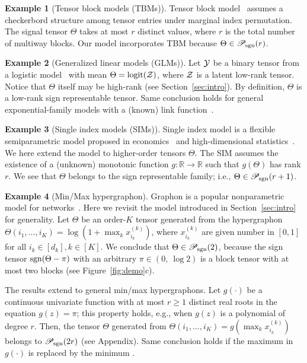 \documentclass[11pt]{article}
\theoremstyle{plain}
\theoremstyle{definition}
\newtheorem{example}{Example}
\def\sign{\textup{sgn}}
\def\caliP{\mathscr{P}_{\textup{sgn}}}
\begin{document}
\begin{example}[Tensor block models (TBMs)] Tensor block model~\citep{wang2019multiway,chi2020provable} assumes a checkerbord structure among tensor entries under marginal index permutation. The signal tensor $\Theta$ takes at most $r$ distinct values, where $r$ is the total number of multiway blocks. Our model incorporates TBM because $\Theta \in \caliP(r)$. \\
\end{example}


\begin{example}[Generalized linear models (GLMs)] Let $\mathcal{Y}$ be a binary tensor from a logistic model~\citep{wang2018learning} with mean $\Theta=\text{logit}(\mathcal{Z})$, where $\mathcal{Z}$ is a latent low-rank tensor. Notice that $\Theta$ itself may be high-rank (see Section~\ref{sec:intro}). By definition, $\Theta$ is a low-rank sign representable tensor. Same conclusion holds for general exponential-family models with a (known) link function~\citep{hong2020generalized}. \\
\end{example}

\begin{example}[Single index models (SIMs)] Single index model is a flexible semiparametric model proposed in economics~\citep{robinson1988root} and high-dimensional statistics~\citep{balabdaoui2019least,ganti2017learning}. We here extend the model to higher-order tensors $\Theta$. The SIM assumes the existence of a (unknown) monotonic function $g\colon \mathbb{R}\to \mathbb{R}$ such that $g(\Theta)$ has rank $r$. We see that $\Theta$ belongs to the sign representable family; i.e., $\Theta\in \caliP(r+1)$. \\
\end{example}

\begin{example}[Min/Max hypergraphon]\label{eq:example}Graphon is a popular nonparametric model for networks~\citep{chan2014consistent,xu2018rates}. Here we revisit the model introduced in Section~\ref{sec:intro} for generality. Let $\Theta$ be an order-$K$ tensor generated from the hypergraphon $\Theta(i_1,\ldots,i_K)=\log(1+\max_kx^{(k)}_{i_k})$, where $x^{(k)}_{i_k}$ are given number in $[0,1]$ for all $i_k\in[d_k], k\in[K]$. We conclude that $\Theta \in \caliP(2)$, because the sign tensor $\sign(\Theta-\pi)$ with an arbitrary $\pi\in(0,\ \log 2)$ is a block tensor with at most two blocks (see Figure~\ref{fig:demo}c).

The results extend to general min/max hypergraphons. Let $g(\cdot)$ be a continuous univariate function with at most $r\geq 1$ distinct real roots in the equation $g(z)=\pi$; this property holds, e.g., when $g(z)$ is a polynomial of degree $r$. Then, the tensor $\Theta$ generated from $\Theta(i_1,\ldots,i_K)=g(\max_kx^{(k)}_{i_k})$ belongs to $\caliP(2r)$ (see Appendix). Same conclusion holds if the maximum in $g(\cdot)$ is replaced by the minimum . 
\end{example}
\end{document}
